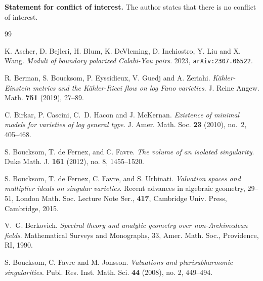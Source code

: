 \documentclass[11pt, leqno]{amsart}%
\theoremstyle{plain}
\theoremstyle{definition}
\theoremstyle{remark}
\numberwithin{equation}{section}
\begin{document}
\noindent\textbf{Statement for conflict of interest.} The author states that there is no conflict of interest.








\begin{thebibliography}{99}

     K. Ascher, D. Bejleri, H. Blum, K. DeVleming, D. Inchiostro, Y. Liu and X. Wang. \emph{Moduli of boundary polarized {C}alabi-{Y}au pairs}.
    2023, \texttt{arXiv:2307.06522}.
	
     R. Berman, S. Boucksom, P. Eyssidieux, V. Guedj and A. Zeriahi. \emph{K\"ahler-Einstein metrics and the K\"ahler-Ricci flow on log Fano varieties}.
    J. Reine Angew. Math. \textbf{751} (2019), 27–89.

     C. Birkar, P. Cascini, C.~D. Hacon and J. McKernan. \emph{Existence of minimal models for varieties of log general type}.
    J. Amer. Math. Soc. \textbf{23} (2010), no.~2, 405--468.

    
     S. Boucksom, T. de Fernex, and C. Favre. \emph{The volume of an isolated singularity}.
    Duke Math. J. \textbf{161} (2012), no. 8, 1455--1520.
	
     S. Boucksom, T. de Fernex, C. Favre, and S. Urbinati. \emph{Valuation spaces and multiplier ideals on singular varieties}. Recent advances in algebraic geometry, 29--51,
    London Math. Soc. Lecture Note Ser., \textbf{417}, Cambridge Univ. Press, Cambridge, 2015.
	

     V.~G. Berkovich. \emph{Spectral theory and analytic geometry over non-Archimedean fields}. 
    Mathematical Surveys and Monographs, 33, Amer. Math. Soc., Providence, RI, 1990.

     S. Boucksom, C. Favre and M. Jonsson. \emph{Valuations and plurisubharmonic singularities}. 
    Publ. Res. Inst. Math. Sci. \textbf{44} (2008), no. 2, 449–494.


\end{thebibliography}
\end{document}
